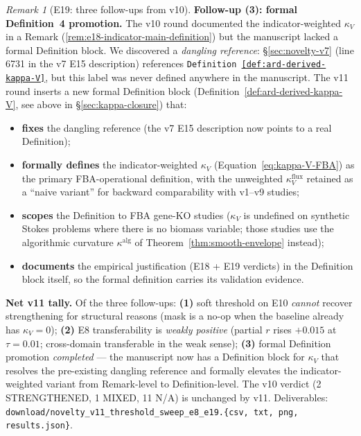 \documentclass[11pt,a4paper]{article}
\theoremstyle{plain}
\theoremstyle{definition}
\theoremstyle{remark}
\newtheorem{remark}[theorem]{Remark}
\begin{document}
\begin{remark}[E19: three follow-ups from v10]
\textbf{Follow-up (3): formal Definition~4 promotion.} The v10 round
documented the indicator-weighted $\kappa_V$ in a Remark
(\ref{rem:e18-indicator-main-definition}) but the manuscript lacked a
formal Definition block. We discovered a \emph{dangling reference}:
\S\ref{sec:novelty-v7} (line 6731 in the v7 E15 description) references
\texttt{Definition~\ref{def:ard-derived-kappa-V}}, but this label was
never defined anywhere in the manuscript. The v11 round inserts a new
formal Definition block (Definition~\ref{def:ard-derived-kappa-V}, see
above in \S\ref{sec:kappa-closure}) that:
\begin{itemize}\itemsep0pt
\item \textbf{fixes} the dangling reference (the v7 E15 description now
points to a real Definition);
\item \textbf{formally defines} the indicator-weighted $\kappa_V$
(Equation~\ref{eq:kappa-V-FBA}) as the primary FBA-operational
definition, with the unweighted $\kappa_V^{\mathrm{flux}}$ retained as a
``naive variant'' for backward comparability with v1--v9 studies;
\item \textbf{scopes} the Definition to FBA gene-KO studies
($\kappa_V$ is undefined on synthetic Stokes problems where there is
no biomass variable; those studies use the algorithmic curvature
$\kappa^{\mathrm{alg}}$ of Theorem~\ref{thm:smooth-envelope} instead);
\item \textbf{documents} the empirical justification (E18 + E19
verdicts) in the Definition block itself, so the formal definition
carries its validation evidence.
\end{itemize}

\textbf{Net v11 tally.} Of the three follow-ups: \textbf{(1)} soft
threshold on E10 \emph{cannot} recover strengthening for structural
reasons (mask is a no-op when the baseline already has $\kappa_V = 0$);
\textbf{(2)} E8 transferability is \emph{weakly positive} (partial $r$
rises $+0.015$ at $\tau = 0.01$; cross-domain transferable in the weak
sense); \textbf{(3)} formal Definition promotion \emph{completed} —
the manuscript now has a Definition block for $\kappa_V$ that resolves
the pre-existing dangling reference and formally elevates the
indicator-weighted variant from Remark-level to Definition-level. The
v10 verdict (2 STRENGTHENED, 1 MIXED, 11 N/A) is unchanged by v11.
Deliverables:
\texttt{download/novelty\_v11\_threshold\_sweep\_e8\_e19.\{csv, txt,
png, results.json\}}.
\end{remark}
\end{document}
